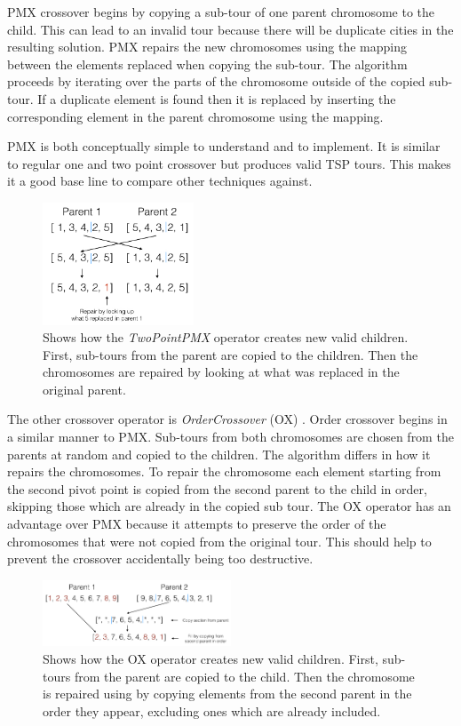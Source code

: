 \documentclass[journal]{IEEEtran}
\begin{document}
PMX crossover begins by copying a sub-tour of one parent chromosome to the child. This can lead to an invalid tour because there will be duplicate cities in the resulting solution. PMX repairs the new chromosomes using the mapping between the elements replaced when copying the sub-tour. The algorithm proceeds by iterating over the parts of the chromosome outside of the copied sub-tour. If a duplicate element is found then it is replaced by inserting the corresponding element in the parent chromosome using the mapping. 

PMX is both conceptually simple to understand and to implement. It is similar to regular one and two point crossover but produces valid TSP tours. This makes it a good base line to compare other techniques against.

\begin{figure}[H]
\centering
\includegraphics[width=0.4\textwidth]{img/pmx_diagram.jpg}
\caption{Shows how the \textit{TwoPointPMX} operator creates new valid children. First, sub-tours from the parent are copied to the children. Then the chromosomes are repaired by looking at what was replaced in the original parent.}
\label{fig:pmx-diagram}
\end{figure}

The other crossover operator is \textit{OrderCrossover} (OX) \cite{moscato1989genetic}. Order crossover begins in a similar manner to PMX. Sub-tours from both chromosomes are chosen from the parents at random and copied to the children. The algorithm differs in how it repairs the chromosomes. To repair the chromosome each element starting from the second pivot point is copied from the second parent to the child in order, skipping those which are already in the copied sub tour. The OX operator has an advantage over PMX because it attempts to preserve the order of the chromosomes that were not copied from the original tour. This should help to prevent the crossover accidentally being too destructive.

\begin{figure}[H]
\centering
\includegraphics[width=0.5\textwidth]{img/order_diagram.jpg}
\caption{Shows how the OX operator creates new valid children. First, sub-tours from the parent are copied to the child. Then the chromosome is repaired using by copying elements from the second parent in the order they appear, excluding ones which are already included.}
\label{fig:order-diagram}
\end{figure}
\end{document}
